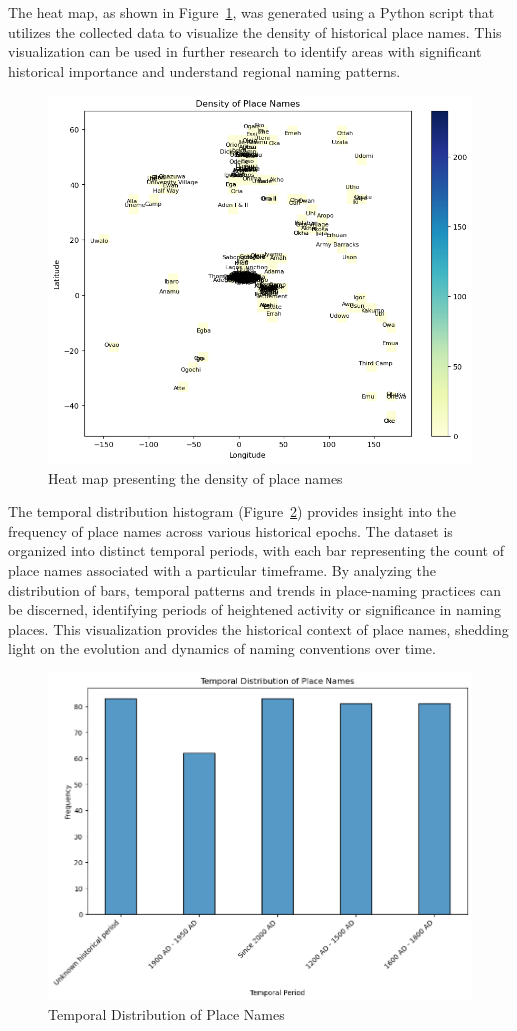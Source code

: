 The heat map, as shown in Figure~\ref{fig:heatmap}, was generated using a Python script that utilizes the collected data to visualize the density of historical place names. This visualization can be used in further research to identify areas with significant historical importance and understand regional naming patterns.
\begin{figure}[htb]
    \centering
    \includegraphics[width=.8\linewidth]{heatmap1.png}
    \caption{Heat map presenting the density of place names}
    \label{fig:heatmap}
\end{figure}


The temporal distribution histogram (Figure~\ref{fig:histgram}) provides insight into the frequency of place names across various historical epochs. The dataset is organized into distinct temporal periods, with each bar representing the count of place names associated with a particular timeframe. By analyzing the distribution of bars, temporal patterns and trends in place-naming practices can be discerned, identifying periods of heightened activity or significance in naming places. This visualization provides the historical context of place names, shedding light on the evolution and dynamics of naming conventions over time.
\begin{figure}[htb]
    \centering
    \includegraphics[width=.8\linewidth]{output2.png}
    \caption{Temporal Distribution of Place Names}
    \label{fig:histgram}
\end{figure}


